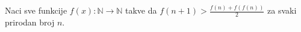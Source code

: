 \problem
Naci sve funkcije $f(x) \colon \mathbb{N} \to \mathbb{N}$ takve da
\(
    f(n + 1) > \frac{f(n) + f(f(n))}{2}
\)
za svaki prirodan broj $n$.
\solution
\endproblem
